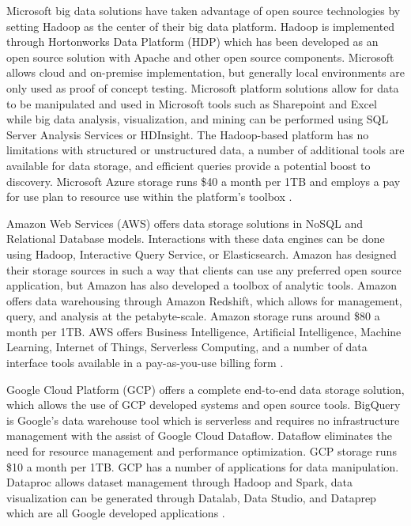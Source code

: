 \documentclass[sigconf]{acmart}
\begin{document}
Microsoft big data solutions have taken advantage of open source technologies by setting Hadoop as the center of their big data platform. Hadoop is implemented through Hortonworks Data Platform (HDP) which has been developed as an open source solution with Apache and other open source components. Microsoft allows cloud and on-premise implementation, but generally local environments are only used as proof of concept testing. Microsoft platform solutions allow for data to be manipulated and used in Microsoft tools such as Sharepoint and Excel while big data analysis, visualization, and mining can be performed using SQL Server Analysis Services or HDInsight. The Hadoop-based platform has no limitations with structured or unstructured data, a number of additional tools are available for data storage, and efficient queries provide a potential boost to discovery. Microsoft Azure storage runs \$40 a month per 1TB and employs a pay for use plan to resource use within the platform's toolbox \cite{www-msdn}.

Amazon Web Services (AWS) offers data storage solutions in NoSQL and Relational Database models. Interactions with these data engines can be done using Hadoop, Interactive Query Service, or Elasticsearch. Amazon has designed their storage sources in such a way that clients can use any preferred open source application, but Amazon has also developed a toolbox of analytic tools. Amazon offers data warehousing through Amazon Redshift, which allows for management, query, and analysis at the petabyte-scale. Amazon storage runs around \$80 a month per 1TB. AWS offers Business Intelligence, Artificial Intelligence, Machine Learning, Internet of Things, Serverless Computing, and a number of data interface tools available in a pay-as-you-use billing form \cite{www-aws}.

Google Cloud Platform (GCP) offers a complete end-to-end data storage solution, which allows the use of GCP developed systems and open source tools. BigQuery is Google's data warehouse tool which is serverless and requires no infrastructure management with the assist of Google Cloud Dataflow. Dataflow eliminates the need for resource management and performance optimization. GCP storage runs \$10 a month per 1TB. GCP has a number of applications for data manipulation. Dataproc allows dataset management through Hadoop and Spark, data visualization can be generated through Datalab, Data Studio, and Dataprep which are all Google developed applications \cite{www-gcp}.
\end{document}
